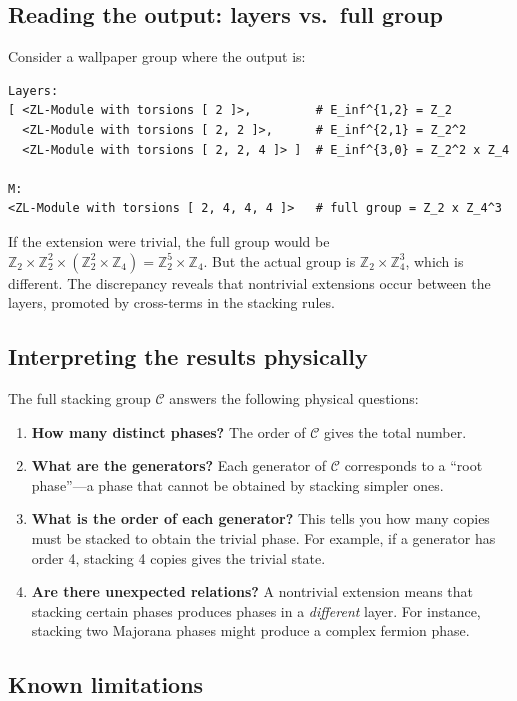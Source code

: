 \documentclass{SciPost}
\theoremstyle{definition}
\newcommand{\Zt}{\mathbb{Z}_2}
\newcommand{\Zn}[1]{\mathbb{Z}_{#1}}
\begin{document}
\subsection{Reading the output: layers vs.\ full group}
\label{subsec:layers-vs-full}

Consider a wallpaper group where the output is:
\begin{verbatim}
Layers:
[ <ZL-Module with torsions [ 2 ]>,         # E_inf^{1,2} = Z_2
  <ZL-Module with torsions [ 2, 2 ]>,      # E_inf^{2,1} = Z_2^2
  <ZL-Module with torsions [ 2, 2, 4 ]> ]  # E_inf^{3,0} = Z_2^2 x Z_4

M:
<ZL-Module with torsions [ 2, 4, 4, 4 ]>   # full group = Z_2 x Z_4^3
\end{verbatim}

If the extension were trivial, the full group would be $\Zt \times \Zt^2 \times (\Zt^2 \times \Zn{4}) = \Zt^5 \times \Zn{4}$.
But the actual group is $\Zt \times \Zn{4}^3$, which is different.
The discrepancy reveals that nontrivial extensions occur between the layers, promoted by cross-terms in the stacking rules.

\subsection{Interpreting the results physically}
\label{subsec:interpret-results}

The full stacking group $\mathcal{C}$ answers the following physical questions:
\begin{enumerate}[label=(\roman*)]
    \item \textbf{How many distinct phases?} The order of $\mathcal{C}$ gives the total number.
    \item \textbf{What are the generators?} Each generator of $\mathcal{C}$ corresponds to a ``root phase''---a phase that cannot be obtained by stacking simpler ones.
    \item \textbf{What is the order of each generator?} This tells you how many copies must be stacked to obtain the trivial phase. For example, if a generator has order 4, stacking 4 copies gives the trivial state.
    \item \textbf{Are there unexpected relations?} A nontrivial extension means that stacking certain phases produces phases in a \emph{different} layer. For instance, stacking two Majorana phases might produce a complex fermion phase.
\end{enumerate}

\subsection{Known limitations}
\label{subsec:limitations}
\end{document}
